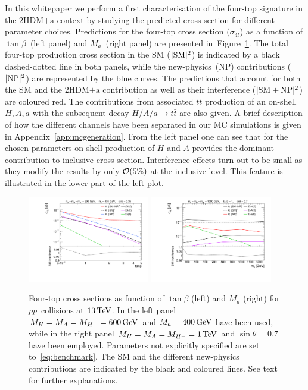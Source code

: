 \documentclass[a4paper, 11pt,notoc]{article}
\newcommand{\mA}{\ensuremath{M_{A}}\xspace}
\newcommand{\ma}{\ensuremath{M_{a}}\xspace}
\newcommand{\mH}{\ensuremath{M_{H}}\xspace}
\newcommand{\mHc}{\ensuremath{M_{H^{\pm}}}\xspace}
\newcommand{\hdma}{\ensuremath{\textrm{2HDM+a}}\xspace}
\begin{document}
 In this whitepaper we perform a first characterisation of the four-top signature in the \hdma context by studying the predicted cross section for different parameter choices. Predictions for the four-top cross section ($\sigma_{4t}$) as a function of $\tan \beta$~(left panel) and $\ma$~(right panel) are presented in~Figure~\ref{fig:4top}. The total four-top production cross section in the SM ($|{\rm SM}|^2$) is indicated by a black dashed-dotted line in both panels, while the new-physics~(NP) contributions ($|{\rm NP}|^2$) are represented by the blue curves. The predictions that account for both the SM and the \hdma contribution as well as  their interference ($|{\rm SM} + {\rm NP}|^2$) are coloured red. The contributions from associated $t \bar t$ production of an on-shell $H, A, a$ with the subsequent decay $H/A/a \to t \bar t$ are also given.  A brief description of how the different channels have been separated in our MC simulations  is given in Appendix~\ref{app:mcgeneration}. From the left panel one can see that for the chosen parameters on-shell production of $H$ and $A$ provides the dominant contribution to inclusive cross section. Interference effects turn out to be small as they modify the results  by only ${\cal O} (5\%)$ at the inclusive level. This feature is illustrated in the lower part of the left plot.
 
 \begin{figure}[!t]
\centering
\includegraphics[width=0.475\textwidth]{plot_tb.pdf} \quad 
\includegraphics[width=0.475\textwidth]{plot_ma.pdf}
\vspace{4mm}
\caption{\label{fig:4top} Four-top cross sections as function of $\tan \beta$ (left) and $\ma$ (right) for $pp$~collisions at $13 \, {\rm TeV}$.   In the left panel $\mH =\mA=\mHc = 600 \, {\rm GeV}$ and  $\ma = 400 \, {\rm GeV}$ have been used, while in the right panel $\mH =\mA=\mHc = 1 \, {\rm TeV}$ and  $\sin \theta = 0.7$ have been employed. Parameters not explicitly specified are set to~\eqref{eq:benchmark}.  The SM and the different new-physics contributions are indicated by the black and coloured lines. See text for further explanations.}
\end{figure}
\end{document}
